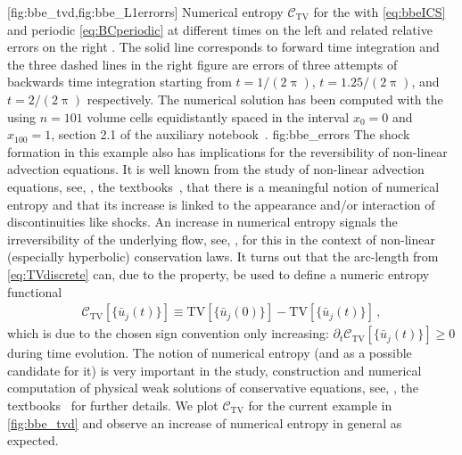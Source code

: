 	[fig:bbe_tvd,fig:bbe_L1errorrs]%
	{%
	Numerical entropy $\mathcal{C}_\mathrm{TV}$ for the \bbe{} with \ic{} \eqref{eq:bbeICS} and periodic \bc{} \eqref{eq:BCperiodic} at different times on the left  and related relative errors on the right .
	The solid line corresponds to forward time integration and the three dashed lines in the right figure  are errors of three attempts of backwards time integration starting from $t=1/(2\uppi)$, $t=1.25/(2\uppi)$, and $t=2/(2\uppi)$ respectively.
	The numerical solution has been computed with the \ktScheme{} using $n=101$ volume cells equidistantly spaced in the interval $x_0=0$ and $x_{100}=1$, \cf{} section 2.1 of the auxiliary notebook~\cite{Steil:2023PhDFVNB}.
	}%
	{fig:bbe_errors}%
The shock formation in this example also has implications for the reversibility of non-linear advection equations.
It is well known from the study of non-linear advection equations, see, \eg{}, the textbooks~\cite{Lax1973,Ames:1992,LeVeque:1992,LeVeque:2002,Hesthaven2007,Toro2009,RezzollaZanotti:2013}, that there is a meaningful notion of numerical entropy and that its increase is linked to the appearance and/or interaction of discontinuities like shocks.
An increase in numerical entropy signals the irreversibility of the underlying flow, see, \eg{},  for this in the context of non-linear (especially hyperbolic) conservation laws.
It turns out that the \tv{} \dash{} arc-length \dash{} from \cref{eq:TVdiscrete} can, due to the \tvni{} property, be used to define a numeric entropy functional
\begin{align}
	\mathcal{C}_\mathrm{TV}[\{ \bar{u}_j (t) \}]\equiv \mathrm{TV}[ \{ \bar{u}_j ( 0 ) \} ]-\mathrm{TV}[ \{ \bar{u}_j (t) \} ]\, ,\label{eq:TVDentropy}
\end{align}
which is due to the chosen sign convention only increasing: $\partial_t \mathcal{C}_\mathrm{TV}[\{ \bar{u}_j (t) \}]\ge 0$ during time evolution.
The notion of numerical entropy (and \tv{} as a possible candidate for it) is very important in the study, construction and numerical computation of physical weak solutions of conservative equations, see, \eg{}, the textbooks~\cite{Lax1973,Ames:1992,LeVeque:1992,LeVeque:2002,Hesthaven2007,Toro2009,RezzollaZanotti:2013} for further details.
We plot $\mathcal{C}_\mathrm{TV}$ for the current example in \cref{fig:bbe_tvd} and observe an increase of numerical entropy in general as expected.
